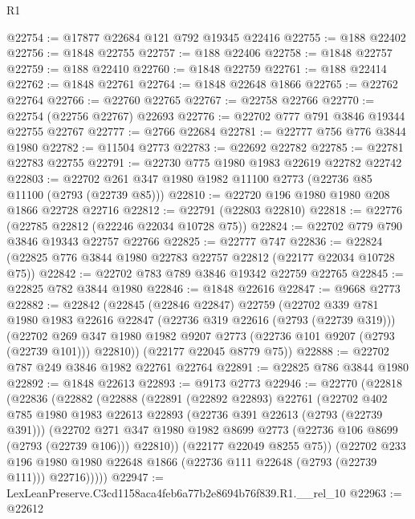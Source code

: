 \begin{lexlean}{R1}
\begin{coremodule}
@22754 := @17877 @22684 @121 @792 @19345 @22416
@22755 := @188 @22402
@22756 := @1848 @22755
@22757 := @188 @22406
@22758 := @1848 @22757
@22759 := @188 @22410
@22760 := @1848 @22759
@22761 := @188 @22414
@22762 := @1848 @22761
@22764 := @1848 @22648 @1866
@22765 := @22762 @22764
@22766 := @22760 @22765
@22767 := @22758 @22766
@22770 := @22754 (@22756 @22767) @22693
@22776 := @22702 @777 @791 @3846 @19344 @22755 @22767
@22777 := @2766 @22684
@22781 := @22777 @756 @776 @3844 @1980
@22782 := @11504 @2773
@22783 := @22692 @22782
@22785 := @22781 @22783 @22755
@22791 := @22730 @775 @1980 @1983 @22619 @22782 @22742
@22803 := @22702 @261 @347 @1980 @1982 @11100 @2773 (@22736 @85 @11100 (@2793 (@22739 @85)))
@22810 := @22720 @196 @1980 @1980 @208 @1866 @22728 @22716
@22812 := @22791 (@22803 @22810)
@22818 := @22776 (@22785 @22812 (@22246 @22034 @10728 @75))
@22824 := @22702 @779 @790 @3846 @19343 @22757 @22766
@22825 := @22777 @747
@22836 := @22824 (@22825 @776 @3844 @1980 @22783 @22757 @22812 (@22177 @22034 @10728 @75))
@22842 := @22702 @783 @789 @3846 @19342 @22759 @22765
@22845 := @22825 @782 @3844 @1980
@22846 := @1848 @22616
@22847 := @9668 @2773
@22882 := @22842
    (@22845
      (@22846 @22847)
      @22759
      (@22702
        @339
        @781
        @1980
        @1983
        @22616
        @22847
        (@22736 @319 @22616 (@2793 (@22739 @319)))
        (@22702 @269 @347 @1980 @1982 @9207 @2773 (@22736 @101 @9207 (@2793 (@22739 @101))) @22810))
      (@22177 @22045 @8779 @75))
@22888 := @22702 @787 @249 @3846 @1982 @22761 @22764
@22891 := @22825 @786 @3844 @1980
@22892 := @1848 @22613
@22893 := @9173 @2773
@22946 := @22770
    (@22818
      (@22836
        (@22882
          (@22888
            (@22891
              (@22892 @22893)
              @22761
              (@22702
                @402
                @785
                @1980
                @1983
                @22613
                @22893
                (@22736 @391 @22613 (@2793 (@22739 @391)))
                (@22702
                  @271
                  @347
                  @1980
                  @1982
                  @8699
                  @2773
                  (@22736 @106 @8699 (@2793 (@22739 @106)))
                  @22810))
              (@22177 @22049 @8255 @75))
            (@22702
              @233
              @196
              @1980
              @1980
              @22648
              @1866
              (@22736 @111 @22648 (@2793 (@22739 @111)))
              @22716)))))
@22947 := LexLeanPreserve.C3cd1158aca4feb6a77b2e8694b76f839.R1.__rel_10
@22963 := @22612

\end{coremodule}
\end{lexlean}
